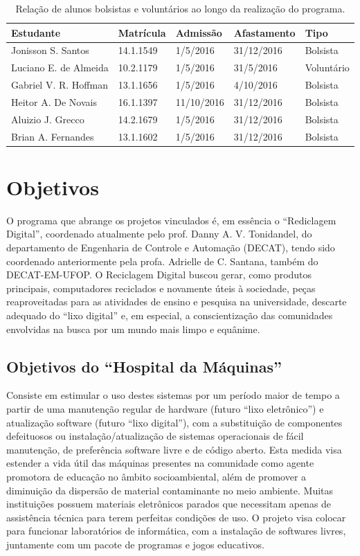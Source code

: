 \documentclass[
	12pt,				%
	openright,			%
	oneside,			%
	a4paper,			%
	english,			%
	spanish,			%
	brazil,				%
	]{abntex2}
\begin{document}
\begin{table}[H]
\centering
\caption{Relação de alunos bolsistas e voluntários ao longo da realização do programa.}
\label{tabela1}
\begin{tabular}{|l|l|l|l|l|}
\hline
\textbf{Estudante} & \textbf{Matrícula} & \textbf{Admissão} & \textbf{Afastamento} & \textbf{Tipo} \\ \hline
Jonisson S. Santos & 14.1.1549 & 1/5/2016 & 31/12/2016 & Bolsista \\ \hline
Luciano E. de Almeida & 10.2.1179 & 1/5/2016 & 31/5/2016 & Voluntário \\ \hline
Gabriel V. R. Hoffman & 13.1.1656 & 1/5/2016 & 4/10/2016 & Bolsista \\ \hline
Heitor A. De Novais & 16.1.1397 & 11/10/2016 & 31/12/2016 & Bolsista \\ \hline
Aluizio J. Grecco & 14.2.1679 & 1/5/2016 & 31/12/2016 & Bolsista \\ \hline
Brian A. Fernandes & 13.1.1602 & 1/5/2016 & 31/12/2016 & Bolsista \\ \hline
\end{tabular}
\end{table}

\chapter{Objetivos}

O programa que abrange os projetos vinculados é, em essência o ``Rediclagem Digital'', coordenado atualmente pelo prof. Danny A. V. Tonidandel, do departamento de Engenharia de Controle e Automação (DECAT), tendo sido coordenado anteriormente pela profa. Adrielle de C. Santana, também do DECAT-EM-UFOP. O Reciclagem Digital buscou gerar, como produtos principais, computadores reciclados e novamente úteis à sociedade, peças reaproveitadas para as atividades de ensino e pesquisa na universidade, descarte adequado do ``lixo digital'' e, em especial, a conscientização das comunidades envolvidas na busca por um mundo mais limpo e equânime.

\section{Objetivos do ``Hospital da Máquinas''}
Consiste em estimular o uso destes sistemas por um período maior de tempo a partir de uma manutenção regular de hardware (futuro “lixo eletrônico”) e atualização software (futuro “lixo digital”), com a substituição de componentes defeituosos ou instalação/atualização de sistemas operacionais de fácil manutenção, de preferência software livre e de código aberto. Esta medida visa estender a vida útil das máquinas presentes na comunidade como agente promotora de educação no âmbito socioambiental, além de promover a diminuição da dispersão de material contaminante no meio ambiente. Muitas instituições possuem materiais eletrônicos parados que necessitam apenas de assistência técnica para terem perfeitas condições de uso. O projeto visa colocar para funcionar laboratórios de informática, com a instalação de softwares livres, juntamente com um pacote de programas e jogos educativos.
\end{document}
